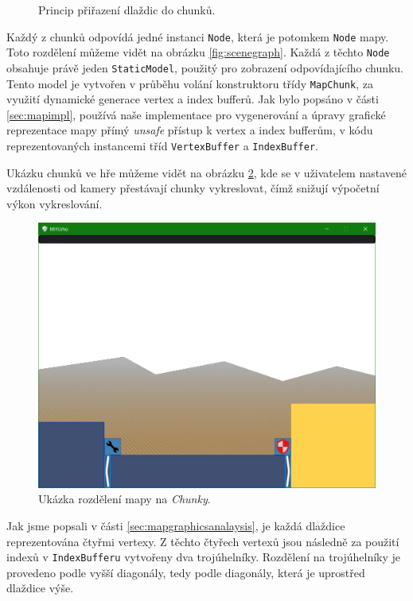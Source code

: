 \begin{figure}[h]
	\centering
	\fontsize{10pt}{12pt}\selectfont
	\def\svgwidth{0.7\textwidth}
	
	\caption{Princip přiřazení dlaždic do chunků.}
	\label{fig:mapdisplay}
\end{figure}

Každý z chunků odpovídá jedné instanci \texttt{Node}, která je potomkem \texttt{Node} mapy. Toto rozdělení můžeme vidět na obrázku \ref{fig:scenegraph}. Každá z těchto \texttt{Node} obsahuje právě jeden \texttt{StaticModel}, použitý pro zobrazení odpovídajícího chunku. Tento model je vytvořen v průběhu volání konstruktoru třídy \texttt{MapChunk}, za využití dynamické generace vertex a index bufferů. Jak bylo popsáno v části \ref{sec:mapimpl}, používá naše implementace pro vygenerování a úpravy grafické reprezentace mapy přímý \textit{unsafe} přístup k vertex a index bufferům, v kódu reprezentovaných instancemi tříd \texttt{VertexBuffer} a \texttt{IndexBuffer}.


Ukázku chunků ve hře můžeme vidět na obrázku \ref{fig:chunks}, kde se v uživatelem nastavené vzdálenosti od kamery přestávají chunky vykreslovat, čímž snižují výpočetní výkon vykreslování.

\begin{figure}[h]
	\centering
	\includegraphics{img/chunks.png}
	\caption{Ukázka rozdělení mapy na \textit{Chunky}.}
	\label{fig:chunks}
\end{figure}

Jak jsme popsali v části \ref{sec:mapgraphicsanalaysis}, je každá dlaždice reprezentována čtyřmi vertexy. Z těchto čtyřech vertexů jsou následně za použití indexů v \texttt{IndexBufferu} vytvořeny dva trojúhelníky. Rozdělení na trojúhelníky je provedeno podle vyšší diagonály, tedy podle diagonály, která je uprostřed dlaždice výše. 

